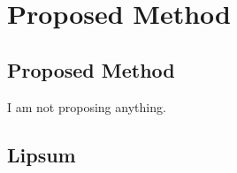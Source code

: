 \chapter{Proposed Method}

\section{Proposed Method}

I am not proposing anything.

\section{Lipsum}

\lipsum
\lipsum
\lipsum
\lipsum
